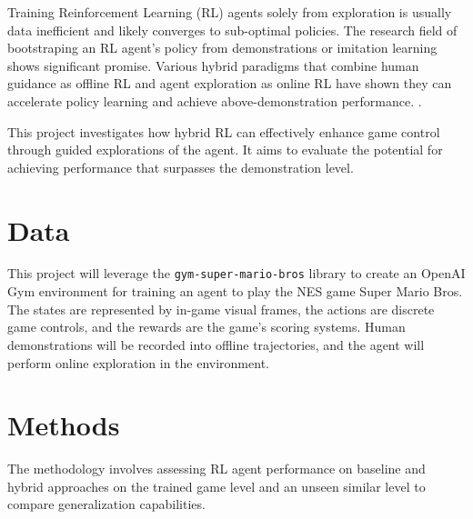 \documentclass{article}
\begin{document}

Training Reinforcement Learning (RL) agents solely from exploration is usually 
data inefficient and likely converges to sub-optimal policies. 
The research field of bootstraping an RL agent's policy from demonstrations or 
imitation learning shows significant promise. 
Various hybrid paradigms that combine human guidance as offline RL and agent 
exploration as online RL have shown they can accelerate policy learning and 
achieve above-demonstration performance.
\cite{hester_dqfd_2017,nair_bcrl_overcoming_2018, song_hybrid_2023, ren_hybrid_2024, 
Coletti2023EffectivenessOW}.

This project investigates how hybrid RL can effectively enhance game control 
through guided explorations of the agent. It aims to evaluate the potential 
for achieving performance that surpasses the demonstration level.


\section{Data}
This project will leverage the \texttt{gym-super-mario-bros} library to create 
an OpenAI Gym environment for training an agent to play the NES game Super Mario Bros. The states are represented 
by in-game visual frames, the actions are discrete game controls, and the 
rewards are the game's scoring systems. Human demonstrations will be recorded 
into offline trajectories, and the agent will perform online exploration in 
the environment.


\section{Methods}
The methodology involves assessing RL agent performance on baseline and hybrid 
approaches on the trained game level and an unseen similar level to compare 
generalization capabilities.
\end{document}
